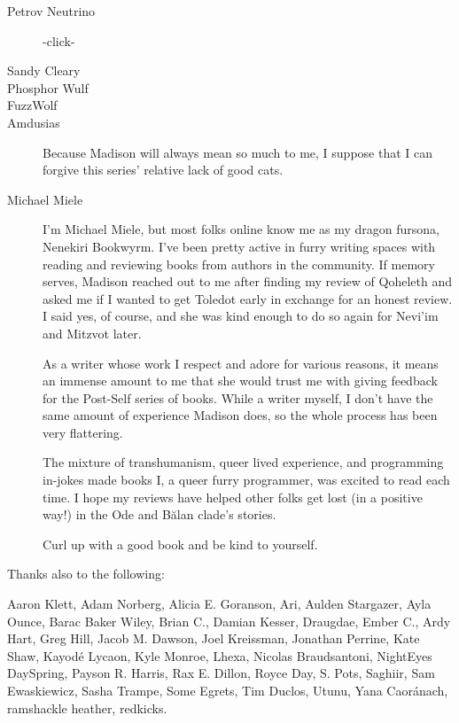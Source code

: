 \begin{description}
  \item[Petrov Neutrino]
  -click-

  \item[Sandy Cleary]
  
  \item[Phosphor Wulf]

  \item[FuzzWolf]

  \item[Amdusias]
  Because Madison will always mean so much to me, I suppose that I can forgive this series' relative lack of good cats.

  \item[Michael Miele]
  I'm Michael Miele, but most folks online know me as my dragon fursona, Nenekiri Bookwyrm. I've been pretty active in furry writing spaces with reading and reviewing books from authors in the community. If memory serves, Madison reached out to me after finding my review of Qoheleth and asked me if I wanted to get Toledot early in exchange for an honest review. I said yes, of course, and she was kind enough to do so again for Nevi'im and Mitzvot later.

  As a writer whose work I respect and adore for various reasons, it means an immense amount to me that she would trust me with giving feedback for the Post-Self series of books. While a writer myself, I don’t have the same amount of experience Madison does, so the whole process has been very flattering.

  The mixture of transhumanism, queer lived experience, and programming in-jokes made books I, a queer furry programmer, was excited to read each time. I hope my reviews have helped other folks get lost (in a positive way!) in the Ode and Bălan clade's stories.

  Curl up with a good book and be kind to yourself.
\end{description}

Thanks also to the following:

Aaron Klett,
Adam Norberg,
Alicia E. Goranson,
Ari,
Aulden Stargazer,
Ayla Ounce,
Barac Baker Wiley,
Brian C.,
Damian Kesser,
Draugdae,
Ember C.,
Ardy Hart,
Greg Hill,
Jacob M. Dawson,
Joel Kreissman,
Jonathan Perrine,
Kate Shaw,
Kayodé Lycaon,
Kyle Monroe,
Lhexa,
Nicolas Braudsantoni,
NightEyes DaySpring,
Payson R. Harris,
Rax E. Dillon,
Royce Day,
S. Pots,
Saghiir,
Sam Ewaskiewicz,
Sasha Trampe,
Some Egrets,
Tim Duclos,
Utunu,
Yana Caoránach,
ramshackle heather,
redkicks.

